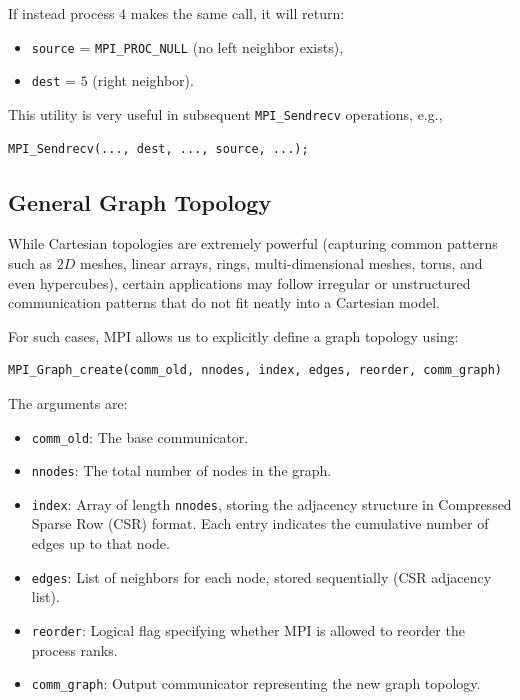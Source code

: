 \documentclass[12pt]{book}
\begin{document}
If instead process $4$ makes the same call, it will return:
\begin{itemize}
    \item \texttt{source} = \texttt{MPI\_PROC\_NULL} (no left neighbor exists),
    \item \texttt{dest} = $5$ (right neighbor).
\end{itemize}

This utility is very useful in subsequent \texttt{MPI\_Sendrecv} operations, e.g.,
\begin{lstlisting}[style=cppstyle]
MPI_Sendrecv(..., dest, ..., source, ...);
\end{lstlisting}

\subsection{General Graph Topology}
While Cartesian topologies are extremely powerful (capturing common patterns such as $2D$ meshes, linear arrays, rings, multi-dimensional meshes, torus, and even hypercubes), certain applications may follow irregular or unstructured communication patterns that do not fit neatly into a Cartesian model.

For such cases, MPI allows us to explicitly define a graph topology using:
\begin{lstlisting}[style=cppstyle]
MPI_Graph_create(comm_old, nnodes, index, edges, reorder, comm_graph)
\end{lstlisting}

The arguments are:
\begin{itemize}
    \item \texttt{comm\_old}: The base communicator.
    \item \texttt{nnodes}: The total number of nodes in the graph.
    \item \texttt{index}: Array of length \texttt{nnodes}, storing the adjacency structure in Compressed Sparse Row (CSR) format. Each entry indicates the cumulative number of edges up to that node.
    \item \texttt{edges}: List of neighbors for each node, stored sequentially (CSR adjacency list).
    \item \texttt{reorder}: Logical flag specifying whether MPI is allowed to reorder the process ranks.
    \item \texttt{comm\_graph}: Output communicator representing the new graph topology.
\end{itemize}
\end{document}
